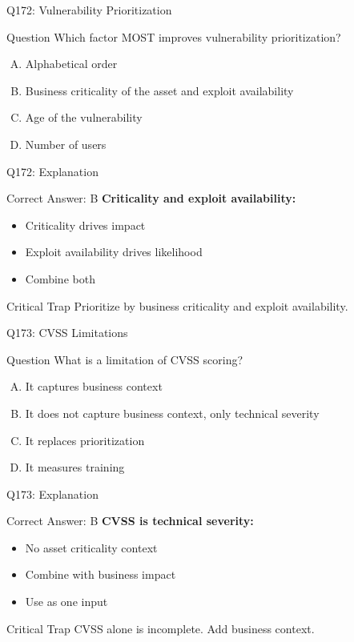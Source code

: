 \documentclass{beamer}
\begin{document}
	\begin{frame}{Q172: Vulnerability Prioritization}
		\begin{block}{Question}
			Which factor MOST improves vulnerability prioritization?
		\end{block}
		\begin{enumerate}[(A)]
			\item Alphabetical order
			\item Business criticality of the asset and exploit availability
			\item Age of the vulnerability
			\item Number of users
		\end{enumerate}
	\end{frame}
	
	\begin{frame}{Q172: Explanation}
		\begin{block}{Correct Answer: B}
			\textbf{Criticality and exploit availability:}
			\begin{itemize}
				\item Criticality drives impact
				\item Exploit availability drives likelihood
				\item Combine both
			\end{itemize}
		\end{block}
		\begin{alertblock}{Critical Trap}
			Prioritize by business criticality and exploit availability.
		\end{alertblock}
	\end{frame}
	
	\begin{frame}{Q173: CVSS Limitations}
		\begin{block}{Question}
			What is a limitation of CVSS scoring?
		\end{block}
		\begin{enumerate}[(A)]
			\item It captures business context
			\item It does not capture business context, only technical severity
			\item It replaces prioritization
			\item It measures training
		\end{enumerate}
	\end{frame}
	
	\begin{frame}{Q173: Explanation}
		\begin{block}{Correct Answer: B}
			\textbf{CVSS is technical severity:}
			\begin{itemize}
				\item No asset criticality context
				\item Combine with business impact
				\item Use as one input
			\end{itemize}
		\end{block}
		\begin{alertblock}{Critical Trap}
			CVSS alone is incomplete. Add business context.
		\end{alertblock}
	\end{frame}
	
\end{document}
